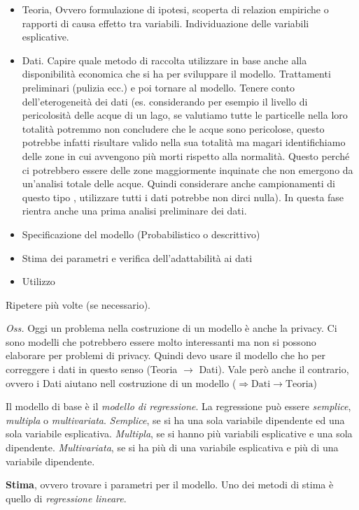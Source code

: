 \documentclass[]{article}
\providecommand{\tightlist}{%
  \setlength{\itemsep}{0pt}\setlength{\parskip}{0pt}}
\begin{document}
\begin{itemize}
\tightlist
\item
  Teoria, Ovvero formulazione di ipotesi, scoperta di relazion empiriche
  o rapporti di causa effetto tra variabili. Individuazione delle
  variabili esplicative.
\item
  Dati. Capire quale metodo di raccolta utilizzare in base anche alla
  disponibilità economica che si ha per sviluppare il modello.
  Trattamenti preliminari (pulizia ecc.) e poi tornare al modello.
  Tenere conto dell'eterogeneità dei dati (es. considerando per esempio
  il livello di pericolosità delle acque di un lago, se valutiamo tutte
  le particelle nella loro totalità potremmo non concludere che le acque
  sono pericolose, questo potrebbe infatti risultare valido nella sua
  totalità ma magari identifichiamo delle zone in cui avvengono più
  morti rispetto alla normalità. Questo perché ci potrebbero essere
  delle zone maggiormente inquinate che non emergono da un'analisi
  totale delle acque. Quindi considerare anche campionamenti di questo
  tipo , utilizzare tutti i dati potrebbe non dirci nulla). In questa
  fase rientra anche una prima analisi preliminare dei dati.
\item
  Specificazione del modello (Probabilistico o descrittivo)
\item
  Stima dei parametri e verifica dell'adattabilità ai dati
\item
  Utilizzo
\end{itemize}

Ripetere più volte (se necessario).

\emph{Oss.} Oggi un problema nella costruzione di un modello è anche la
privacy. Ci sono modelli che potrebbero essere molto interessanti ma non
si possono elaborare per problemi di privacy. Quindi devo usare il
modello che ho per correggere i dati in questo senso (Teoria
\(\rightarrow\) Dati). Vale però anche il contrario, ovvero i Dati
aiutano nell costruzione di un modello
(\(\Rightarrow \text{Dati} \rightarrow \text{Teoria}\))

Il modello di base è il \emph{modello di regressione}. La regressione
può essere \emph{semplice}, \emph{multipla} o \emph{multivariata}.
\emph{Semplice}, se si ha una sola variabile dipendente ed una sola
variabile esplicativa. \emph{Multipla}, se si hanno più variabili
esplicative e una sola dipendente. \emph{Multivariata}, se si ha più di
una variabile esplicativa e più di una variabile dipendente.

\textbf{Stima}, ovvero trovare i parametri per il modello. Uno dei
metodi di stima è quello di \emph{regressione lineare}.
\end{document}
